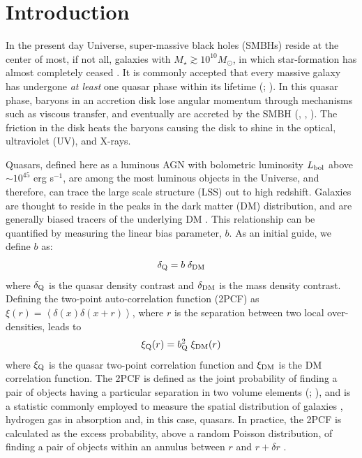 \documentclass[apj, numberedappendix]{emulateapj}
\begin{document}
\section{Introduction}\label{sec:1}
In the present day Universe, super-massive black holes (SMBHs) reside at the center of most, if not all, galaxies with $M_{\star} \gtrsim 10^{10} M_{\odot}$, in which star-formation has almost completely ceased \citep[e.g.,][]{Bell2008, Bower2017}. It is commonly accepted that every massive galaxy has undergone {\it at least} one quasar phase within its lifetime (\citealt{Soltan1982}; \citealt{Richstone1998}). In this quasar phase, baryons in an accretion disk lose angular momentum through mechanisms such as viscous transfer, and eventually are accreted by the SMBH (\citealt{Salpeter1964}, \citealt{Lynden-Bell1969}, \citealt{Rees1984}). The friction in the disk heats the baryons causing the disk to shine in the optical, ultraviolet (UV), and X-rays. 

Quasars, defined here as a luminous AGN with bolometric luminosity $L_{\rm bol}$ above $\sim 10^{45}$ erg s$^{-1}$, are among the most luminous objects in the Universe, and therefore, can trace the large scale structure (LSS) out to high redshift. Galaxies are thought to reside in the peaks in the dark matter (DM) distribution, and are generally biased tracers of the underlying DM \citep[e.g., ][]{DekelLahav1999, ShethTormen1999, Peacock_book1999}. This relationship can be quantified by measuring the linear bias parameter, $b$. As an initial guide, we define $b$ as: 
\begin{equation}\label{bias}
\delta_{\rm Q} = b \; \delta_{\rm DM}
\end{equation}
where $\delta_{\rm Q}$ is the quasar density contrast and $\delta_{\rm DM}$ is the mass density contrast. Defining the two-point auto-correlation function (2PCF) as $\xi(r) = \left \langle \delta(x) \delta(x + r) \right \rangle$, where $r$ is the separation between two local over-densities, leads to 
\begin{equation}
\xi_{\rm Q}(r) = b^{2}_{\rm Q} \; \xi_{\rm DM}(r)
\end{equation} 
where $\xi_{\rm Q}$ is the quasar two-point correlation function and $\xi_{\rm DM}$ is the DM correlation function. The 2PCF is defined as the joint probability of finding a pair of objects having a particular separation in two volume elements (\citealt{Totsuji1969}; \citealt{Peebles1980}), and is a statistic commonly employed to measure the spatial distribution of galaxies \citep[e.g.,][]{Zehavi2011}, hydrogen gas in absorption \citep[e.g.,][]{Bautista2017} and, in this case, quasars. In practice, the 2PCF is calculated as the excess probability, above a random Poisson distribution, of finding a pair of objects within an annulus between $r$ and $r+\delta r$ \citep{Peebles1980, MartinezSaar2002, Feigelson2012}. 
\end{document}
